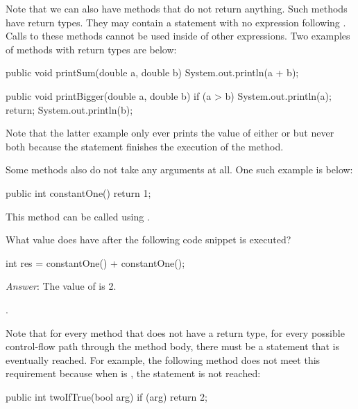 Note that we can also have methods that do not return anything. Such
methods have  return types. They may contain a 
statement with no expression following .
Calls to these methods cannot be used inside of other expressions.
Two examples of methods with  return types are below:
\begin{code}
public void printSum(double a, double b) {
  System.out.println(a + b);
}
\end{code}

\begin{code}
public void printBigger(double a, double b) {
  if (a > b) {
    System.out.println(a);
    return;
  }
  System.out.println(b);
}
\end{code}
Note that the latter example only ever prints the value of either  or  but
never both because
the  statement finishes the execution of the method.

Some methods also do not take any arguments at all. One such example is below:
\begin{code}
public int constantOne() {
  return 1;
}
\end{code}
\noindent This method can be called using .

\begin{example}
What value does  have after the following code snippet is executed?
\begin{code}
int res = constantOne() + constantOne();
\end{code}
\emph{Answer}: The value of  is 2.
\end{example}.

Note that for every method that does not have a  return type,
for every possible control-flow path through the method body,
there must be a  statement that is eventually reached.
For example, the following method does not meet this requirement
because when  is , the  statement is not
reached:
\begin{code}
public int twoIfTrue(bool arg) {
  if (arg) {
    return 2;
  }
}
\end{code}

